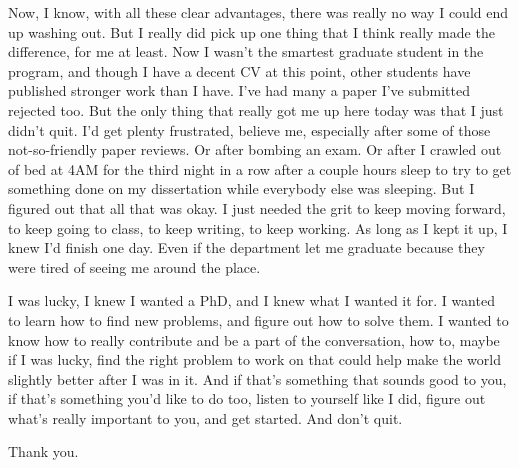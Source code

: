 \documentclass[10pt,letterpaper]{letter}
\begin{document}
Now, I know, with all these clear advantages, there was really no way I could end up washing out.  But I really did pick up one thing that I think really made the difference, for me at least.  Now I wasn't the smartest graduate student in the program, and though I have a decent CV at this point, other students have published stronger work than I have.  I've had many a paper I've submitted rejected too.  But the only thing that really got me up here today was that I just didn't quit.  I'd get plenty frustrated, believe me, especially after some of those not-so-friendly paper reviews.  Or after bombing an exam.  Or after I crawled out of bed at 4AM for the third night in a row after a couple hours sleep to try to get something done on my dissertation while everybody else was sleeping.  But I figured out that all that was okay.  I just needed the grit to keep moving forward, to keep going to class, to keep writing, to keep working.  As long as I kept it up, I knew I'd finish one day.  Even if the department let me graduate because they were tired of seeing me around the place.

I was lucky, I knew I wanted a PhD, and I knew what I wanted it for.  I wanted to learn how to find new problems, and figure out how to solve them.  I wanted to know how to really contribute and be a part of the conversation, how to, maybe if I was lucky, find the right problem to work on that could help make the world slightly better after I was in it.  And if that's something that sounds good to you, if that's something you'd like to do too, listen to yourself like I did, figure out what's really important to you, and get started.  And don't quit.

Thank you.
\end{document}
